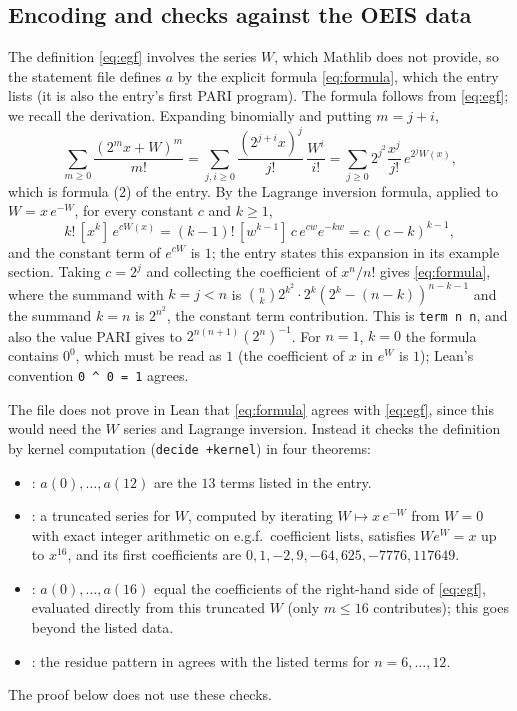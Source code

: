 \documentclass[11pt]{amsart}
\theoremstyle{plain}
\theoremstyle{definition}
\begin{document}
\subsection*{Encoding and checks against the OEIS data}\label{sec:encoding}
The definition \eqref{eq:egf} involves the series $W$, which Mathlib does not provide, so the statement file defines $a$ by the explicit formula \eqref{eq:formula}, which the entry lists (it is also the entry's first PARI program).
The formula follows from \eqref{eq:egf}; we recall the derivation.
Expanding binomially and putting $m=j+i$,
\[
  \sum_{m\ge0}\frac{(2^mx+W)^m}{m!}=\sum_{j,i\ge0}\frac{(2^{j+i}x)^j}{j!}\,\frac{W^i}{i!}
  =\sum_{j\ge0}2^{j^2}\frac{x^j}{j!}\,e^{2^jW(x)},
\]
which is formula (2) of the entry.
By the Lagrange inversion formula, applied to $W=x\,e^{-W}$, for every constant $c$ and $k\ge1$,
\[
  k!\,[x^k]\,e^{cW(x)}=(k-1)!\,[w^{k-1}]\,c\,e^{cw}e^{-kw}=c\,(c-k)^{k-1},
\]
and the constant term of $e^{cW}$ is $1$; the entry states this expansion in its example section.
Taking $c=2^j$ and collecting the coefficient of $x^n/n!$ gives \eqref{eq:formula}, where the summand with $k=j<n$ is $\binom nk2^{k^2}\cdot2^k(2^k-(n-k))^{n-k-1}$ and the summand $k=n$ is $2^{n^2}$, the constant term contribution.
This is \texttt{term n n}, and also the value PARI gives to $2^{n(n+1)}(2^n)^{-1}$.
For $n=1$, $k=0$ the formula contains $0^0$, which must be read as $1$ (the coefficient of $x$ in $e^{W}$ is $1$); Lean's convention \texttt{0 \^{} 0 = 1} agrees.

The file does not prove in Lean that \eqref{eq:formula} agrees with \eqref{eq:egf}, since this would need the $W$ series and Lagrange inversion.
Instead it checks the definition by kernel computation (\texttt{decide +kernel}) in four theorems:
\begin{itemize}
\item {}: $a(0),\dots,a(12)$ are the $13$ terms listed in the entry.
\item {}: a truncated series for $W$, computed by iterating $W\mapsto x\,e^{-W}$ from $W=0$ with exact integer arithmetic on e.g.f.\ coefficient lists, satisfies $We^W=x$ up to $x^{16}$, and its first coefficients are $0,1,-2,9,-64,625,-7776,117649$.
\item {}: $a(0),\dots,a(16)$ equal the coefficients of the right-hand side of \eqref{eq:egf}, evaluated directly from this truncated $W$ (only $m\le16$ contributes); this goes beyond the listed data.
\item {}: the residue pattern in  agrees with the listed terms for $n=6,\dots,12$.
\end{itemize}
The proof below does not use these checks.
\end{document}
